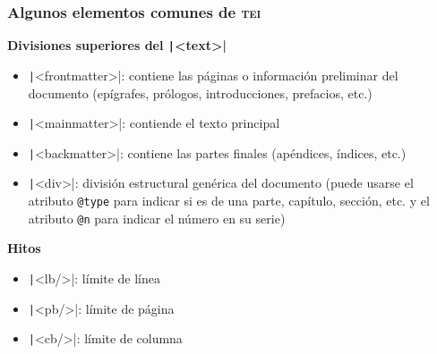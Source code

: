 \documentclass[%
  handout, %
  ]{beamer}
\newcommand*{\azul}[1]{\textcolor{bluenivaca}{#1}}
\newcommand*{\TEI}{\textsc{tei}}
\begin{document}
\begin{frame}
  \frametitle{Algunos elementos comunes de \TEI}

  \textbf{\azul{Divisiones superiores del \texttt|<text>|}}

  \smallskip

  \begin{itemize}
    \item \texttt|<frontmatter>|: contiene las páginas o información preliminar del documento (epígrafes, prólogos, introducciones, prefacios, etc.) 
    \item \texttt|<mainmatter>|: contiende el texto principal
    \item \texttt|<backmatter>|: contiene las partes finales (apéndices, índices, etc.)
    \item \texttt|<div>|: división estructural genérica del documento (puede usarse el atributo \texttt{@type} para indicar si es de una parte, capítulo, sección, etc. y el atributo \texttt{@n} para indicar el número en su serie)
  \end{itemize}

  \bigskip
  
  \textbf{\azul{Hitos}}

  \smallskip

  \begin{itemize}
    \item \texttt|<lb/>|: límite de línea
    \item \texttt|<pb/>|: límite de página
    \item \texttt|<cb/>|: límite de columna
  \end{itemize}
\end{frame}
\end{document}
